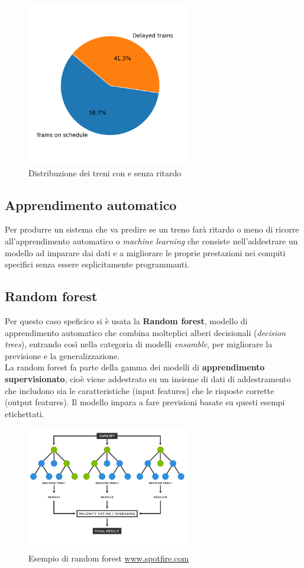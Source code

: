 \documentclass[italian,12pt,a4paper]{article}
\begin{document}
			\begin{figure}[!h]
				\centering
				\includegraphics[width=270px]{img/delay_graph}
				\caption{Distribuzione dei treni con e senza ritardo}
			\end{figure}
			
	\subsection{Apprendimento automatico}
	Per produrre un sistema che va predire se un treno farà ritardo o meno di ricorre all'apprendimento automatico o \textit{machine learning} che consiste nell'addestrare un modello ad imparare dai dati e a migliorare le proprie prestazioni nei compiti specifici senza essere esplicitamente programmanti.
	
	\subsection{Random forest}
	Per questo caso speficico si è usata la \textbf{Random forest}, modello di apprendimento automatico che combina molteplici alberi decisionali (\textit{decision trees}), entrando così nella categoria di modelli \textit{ensamble}, per migliorare la previsione e la generalizzazione.\\
	La random forest fa parte della gamma dei modelli di \textbf{apprendimento supervisionato}, cioè viene addestrato su un insieme di dati di addestramento che includono sia le caratteristiche (input features) che le risposte corrette (output features). 
	Il modello impara a fare previsioni basate su questi esempi etichettati.
		
	\begin{figure}[!h]
		\centering
		\includegraphics[width=270px]{img/random-forest-diagram}
		\caption{Esempio di random forest \href{https://www.spotfire.com/glossary/what-is-a-random-forest}{www.spotfire.com}}
	\end{figure}
\end{document}
